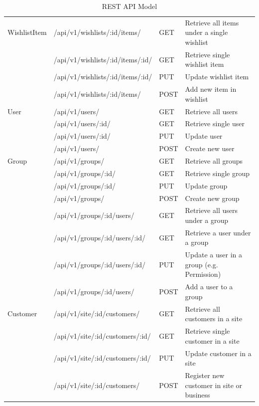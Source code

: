 \documentclass{report}
\begin{document}
\begin{table}[ht]
{\begin{tabular}{llll}
WishlistItem			& /api/v1/wishlists/:id/items/ & GET & Retrieve all items under a single wishlist \\ 
							& /api/v1/wishlists/:id/items/:id/ & GET & Retrieve single wishlist item \\ 
							& /api/v1/wishlists/:id/items/:id/ & PUT & Update wishlist item \\
							& /api/v1/wishlists/:id/items/ & POST & Add new item in wishlist  \\ \hline
User 					& /api/v1/users/ & GET & Retrieve all users \\ 
							& /api/v1/users/:id/ & GET & Retrieve single user \\
							& /api/v1/users/:id/ & PUT & Update user \\ 
							& /api/v1/users/ & POST & Create new user \\  \hline							
Group 					& /api/v1/groups/ & GET & Retrieve all groups \\ 
							& /api/v1/groups/:id/ & GET & Retrieve single group \\
							& /api/v1/groups/:id/ & PUT & Update group \\ 
							& /api/v1/groups/ & POST & Create new group \\  \hline		
							& /api/v1/groups/:id/users/ & GET & Retrieve all users under a group \\ 
							& /api/v1/groups/:id/users/:id/ & GET & Retrieve a user under a group \\
							& /api/v1/groups/:id/users/:id/ & PUT & Update a user in a group (e.g. Permission) \\
							& /api/v1/groups/:id/users/ & POST & Add a user to a group \\ \hline											
Customer 			& /api/v1/site/:id/customers/ & GET & Retrieve all customers in a site \\ 
							& /api/v1/site/:id/customers/:id/ & GET & Retrieve single customer in a site \\
							& /api/v1/site/:id/customers/:id/ & PUT & Update customer in a site \\ 
							& /api/v1/site/:id/customers/ & POST & Register new customer in site or business \\ 				
\end{tabular}
}
\caption{REST API Model}
\label{API Model}
\end{table}
\end{document}
